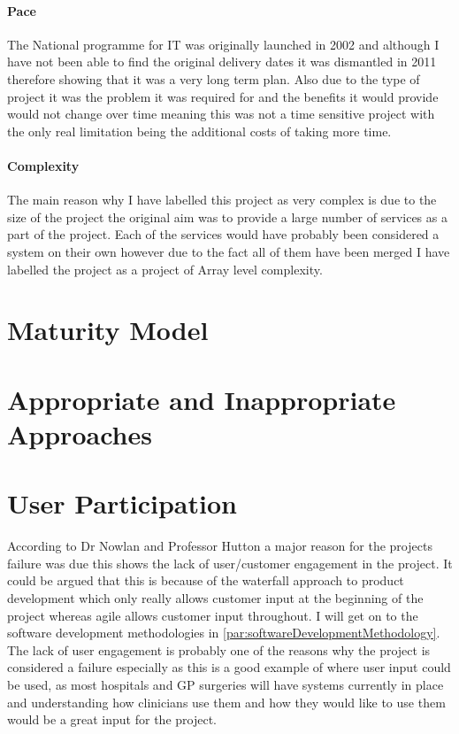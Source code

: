 \documentclass[a4paper,12pt]{scrartcl}
\begin{document}
{{			\paragraph{Pace}
			{
				The National programme for IT was originally launched in 2002 and although I have not been able to find the original delivery dates it was dismantled in 2011 therefore showing that it was a very long term plan. Also due to the type of project it was the problem it was required for and the benefits it would provide would not change over time meaning this was not a time sensitive project with the only real limitation being the additional costs of taking more time.
			}
			\paragraph{Complexity}
			{
				The main reason why I have labelled this project as very complex is due to the size of the project the original aim was to provide a large number of services as a part of the project. Each of the services would have probably been considered a system on their own however due to the fact all of them have been merged I have labelled the project as a project of Array level complexity.
			}
		}
	}
	\section{Maturity Model}
	{
		
	}	
	\section{Appropriate and Inappropriate Approaches}
	{
		
	}
	\section{User Participation}
	{
		According to Dr Nowlan and Professor Hutton a major reason for the projects failure was due \cite{Commons2007} this shows the lack of user/customer engagement in the project. It could be argued that this is because of the waterfall approach to product development which only really allows customer input at the beginning of the project whereas agile allows customer input throughout. I will get on to the software development methodologies in \cref{par:softwareDevelopmentMethodology}. The lack of user engagement is probably one of the reasons why the project is considered a failure especially as this is a good example of where user input could be used, as most hospitals and GP surgeries will have systems currently in place and understanding how clinicians use them and how they would like to use them would be a great input for the project. 
	}
\end{document}
